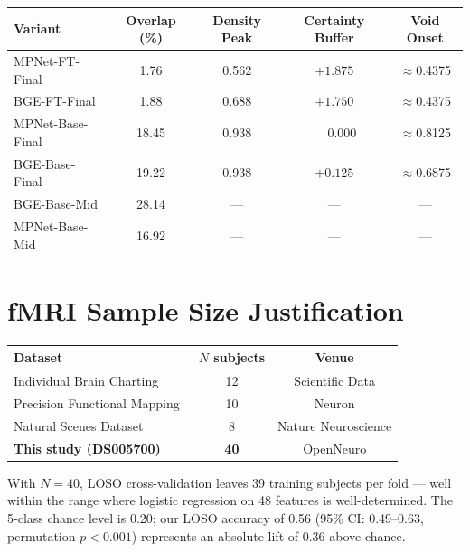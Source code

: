 \documentclass{article}
\begin{document}
\begin{center}
\small
\begin{tabular}{lcccc}
\toprule
Variant & Overlap (\%) & Density Peak & Certainty Buffer & Void Onset \\
\midrule
MPNet-FT-Final   & 1.76  & 0.562 & $+1.875$ & $\approx$0.4375 \\
BGE-FT-Final     & 1.88  & 0.688 & $+1.750$ & $\approx$0.4375 \\
MPNet-Base-Final & 18.45 & 0.938 & $\phantom{+}0.000$ & $\approx$0.8125 \\
BGE-Base-Final   & 19.22 & 0.938 & $+0.125$ & $\approx$0.6875 \\
BGE-Base-Mid     & 28.14 &  ---  &    ---   &    ---    \\
MPNet-Base-Mid   & 16.92 &  ---  &    ---   &    ---    \\
\bottomrule
\end{tabular}
\end{center}

\section{fMRI Sample Size Justification}
\label{app:sample-size}

\begin{center}
\small
\begin{tabular}{lcc}
\toprule
Dataset & $N$ subjects & Venue \\
\midrule
Individual Brain Charting~\citep{pinho2018}         & 12 & Scientific Data \\
Precision Functional Mapping~\citep{gordon2017}     & 10 & Neuron \\
Natural Scenes Dataset~\citep{allen2022}            & 8  & Nature Neuroscience \\
\textbf{This study (DS005700)}~\citep{openneuro2024}& \textbf{40} & OpenNeuro \\
\bottomrule
\end{tabular}
\end{center}

With $N\!=\!40$, LOSO cross-validation leaves 39 training subjects per fold ---
well within the range where logistic regression on 48 features is well-determined.
The 5-class chance level is 0.20; our LOSO accuracy of 0.56
(95\% CI: 0.49--0.63, permutation $p<0.001$) represents an absolute lift of 0.36
above chance.
\end{document}
